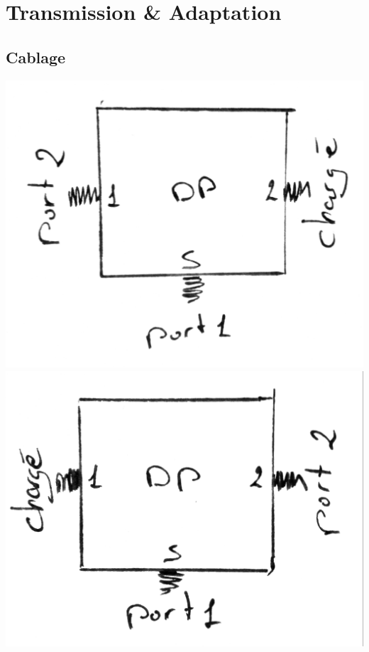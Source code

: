 \documentclass[a4paper,12pt]{report}            %
\begin{document}
\section{Transmission \& Adaptation}

\subsection{Cablage}
\begin{center}
	\includegraphics[scale = 0.15]{pic/DPS1.png}
	\includegraphics[scale = 0.15]{pic/DPS2.png}
\end{center}
\end{document}
